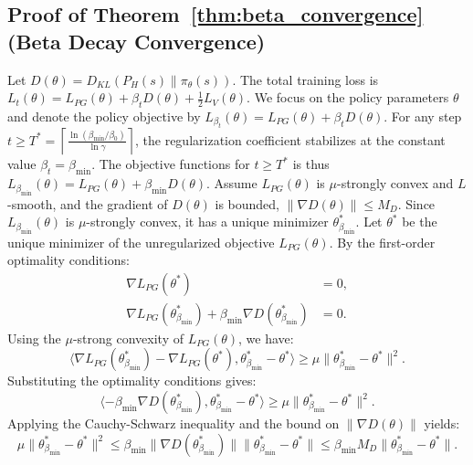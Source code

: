 \documentclass{article}
\begin{document}
\subsection{Proof of Theorem~\ref{thm:beta_convergence} (Beta Decay Convergence)}\label{app:proof_beta_convergence}
Let $D(\theta) = D_{KL}(P_H(s) \parallel \pi_\theta(s))$. The total training loss is $L_t(\theta) = L_{PG}(\theta) + \beta_t D(\theta) + \frac{1}{2} L_V(\theta)$. We focus on the policy parameters $\theta$ and denote the policy objective by $L_{\beta_t}(\theta) = L_{PG}(\theta) + \beta_t D(\theta)$.
For any step $t \geq T^* = \left\lceil \frac{\ln(\beta_{\min}/\beta_0)}{\ln \gamma} \right\rceil$, the regularization coefficient stabilizes at the constant value $\beta_t = \beta_{\min}$. The objective functions for $t \geq T^*$ is thus $L_{\beta_{\min}}(\theta) = L_{PG}(\theta) + \beta_{\min} D(\theta)$.
Assume $L_{PG}(\theta)$ is $\mu$-strongly convex and $L$-smooth, and the gradient of $D(\theta)$ is bounded, $\|\nabla D(\theta)\| \leq M_D$. Since $L_{\beta_{\min}}(\theta)$ is $\mu$-strongly convex, it has a unique minimizer $\theta^*_{\beta_{\min}}$. Let $\theta^*$ be the unique minimizer of the unregularized objective $L_{PG}(\theta)$.
By the first-order optimality conditions:
\begin{align}
    \nabla L_{PG}(\theta^*) &= 0, \\
    \nabla L_{PG}(\theta^*_{\beta_{\min}}) + \beta_{\min} \nabla D(\theta^*_{\beta_{\min}}) &= 0.
\end{align}
Using the $\mu$-strong convexity of $L_{PG}(\theta)$, we have:
\begin{equation}
    \langle \nabla L_{PG}(\theta^*_{\beta_{\min}}) - \nabla L_{PG}(\theta^*), \theta^*_{\beta_{\min}} - \theta^* \rangle \geq \mu \|\theta^*_{\beta_{\min}} - \theta^*\|^2.
\end{equation}
Substituting the optimality conditions gives:
\begin{equation}
    \langle -\beta_{\min} \nabla D(\theta^*_{\beta_{\min}}), \theta^*_{\beta_{\min}} - \theta^* \rangle \geq \mu \|\theta^*_{\beta_{\min}} - \theta^*\|^2.
\end{equation}
Applying the Cauchy-Schwarz inequality and the bound on $\|\nabla D(\theta)\|$ yields:
\begin{equation}
    \mu \|\theta^*_{\beta_{\min}} - \theta^*\|^2 \leq \beta_{\min} \|\nabla D(\theta^*_{\beta_{\min}})\| \|\theta^*_{\beta_{\min}} - \theta^*\| \leq \beta_{\min} M_D \|\theta^*_{\beta_{\min}} - \theta^*\|.
\end{equation}
\end{document}
